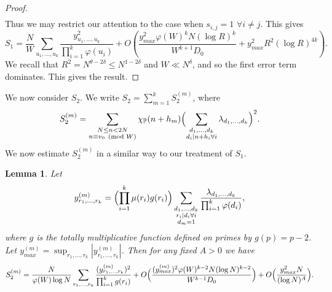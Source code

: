 \documentclass[12pt,a4paper]{amsart}
\theoremstyle{plain}
\newtheorem{lmm}[thrm]{Lemma}
\numberwithin{sblmm}{thrm}
\numberwithin{equation}{section}
\renewcommand{\phi}{\varphi}
\begin{document}
\begin{proof}
\begin{align}
\end{align}
Thus we may restrict our attention to the case when $s_{i,j}=1$ $\forall i\ne j$. This gives
\begin{equation}
S_1=\frac{N}{W}\sum_{u_1,\dotsc,u_k}\frac{y_{u_1,\dotsc,u_k}^2}{\prod_{i=1}^k\phi(u_i)}+O\left(\frac{y_{max}^2 \phi(W)^k N (\log{R})^k}{W^{k+1}D_0}+y_{max}^2R^2(\log{R})^{4k}\right).
\end{equation}
We recall that $R^2=N^{\theta-2\delta}\le N^{1-2\delta}$ and $W\ll N^{\delta}$, and so the first error term dominates. This gives the result.
\end{proof}
We now consider $S_2$. We write $S_2=\sum_{m=1}^kS_2^{(m)}$, where
\begin{equation}
S_2^{(m)}=\sum_{\substack{N\le n<2N\\ n\equiv v_0\pmod{W}}}\chi_{\mathbb{P}}(n+h_m)\Bigl(\sum_{\substack{d_1,\dotsc, d_k\\ d_i|n+h_i\forall i}}\lambda_{d_1,\dotsc,d_k}\Bigr)^2.
\end{equation}
We now estimate $S_2^{(m)}$ in a similar way to our treatment of $S_1$.
\begin{lmm}\label{lmm:S2Expression1}
Let
\[y^{(m)}_{r_1,\dotsc,r_k}=\Bigl(\prod_{i=1}^k\mu(r_i)g(r_i)\Bigr)\sum_{\substack{d_1,\dotsc,d_k\\ r_i|d_i\forall i\\ d_m=1}}\frac{\lambda_{d_1,\dotsc,d_k}}{\prod_{i=1}^k \phi(d_i)},\]
where $g$ is the totally multiplicative function defined on primes by $g(p)=p-2$. Let $y^{(m)}_{max}=\sup_{r_1,\dotsc,r_k}|y^{(m)}_{r_1,\dotsc,r_k}|$. Then for any fixed $A>0$ we have
\[S_2^{(m)}=\frac{N}{\phi(W)\log{N}}\sum_{r_1,\dotsc,r_k}\frac{(y^{(m)}_{r_1,\dotsc,r_k})^2}{\prod_{i=1}^kg(r_i)}+O\Bigl(\frac{(y^{(m)}_{max})^2 \phi(W)^{k-2} N (\log{N})^{k-2}}{W^{k-1}D_0}\Bigr)+O\Bigl(\frac{y_{max}^2 N}{(\log{N})^A}\Bigr).\]
\end{lmm}
\end{document}
